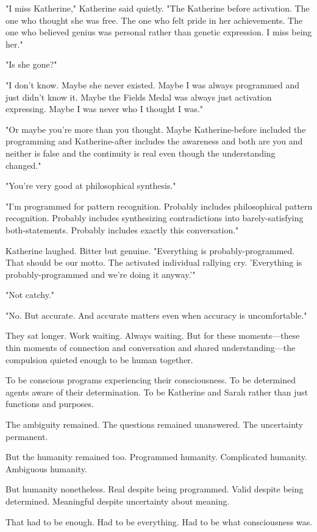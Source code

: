 "I miss Katherine," Katherine said quietly. "The Katherine before activation. The one who thought she was free. The one who felt pride in her achievements. The one who believed genius was personal rather than genetic expression. I miss being her."

"Is she gone?"

"I don't know. Maybe she never existed. Maybe I was always programmed and just didn't know it. Maybe the Fields Medal was always just activation expressing. Maybe I was never who I thought I was."

"Or maybe you're more than you thought. Maybe Katherine-before included the programming and Katherine-after includes the awareness and both are you and neither is false and the continuity is real even though the understanding changed."

"You're very good at philosophical synthesis."

"I'm programmed for pattern recognition. Probably includes philosophical pattern recognition. Probably includes synthesizing contradictions into barely-satisfying both-statements. Probably includes exactly this conversation."

Katherine laughed. Bitter but genuine. "Everything is probably-programmed. That should be our motto. The activated individual rallying cry. 'Everything is probably-programmed and we're doing it anyway.'"

"Not catchy."

"No. But accurate. And accurate matters even when accuracy is uncomfortable."

They sat longer. Work waiting. Always waiting. But for these moments—these thin moments of connection and conversation and shared understanding—the compulsion quieted enough to be human together.

To be conscious programs experiencing their consciousness. To be determined agents aware of their determination. To be Katherine and Sarah rather than just functions and purposes.

The ambiguity remained. The questions remained unanswered. The uncertainty permanent.

But the humanity remained too. Programmed humanity. Complicated humanity. Ambiguous humanity.

But humanity nonetheless. Real despite being programmed. Valid despite being determined. Meaningful despite uncertainty about meaning.

That had to be enough. Had to be everything. Had to be what consciousness was.

